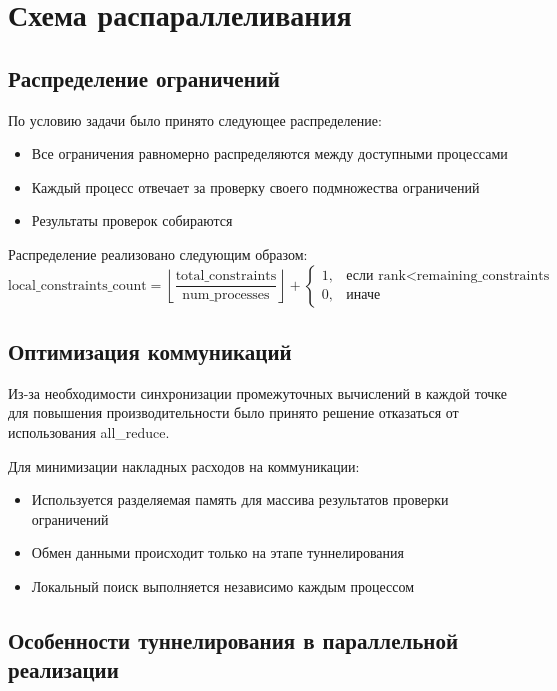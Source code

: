 \documentclass[12pt]{article}
\begin{document}
\section{Схема распараллеливания}
\subsection{Распределение ограничений}

По условию задачи было принято следующее распределение:
\begin{itemize}
    \item Все ограничения равномерно распределяются между доступными процессами
    \item Каждый процесс отвечает за проверку своего подмножества ограничений
    \item Результаты проверок собираются
\end{itemize}

Распределение реализовано следующим образом:
\begin{equation}
    \text{local\_constraints\_count} = \left\lfloor\frac{\text{total\_constraints}}{\text{num\_processes}}\right\rfloor + 
    \begin{cases}
        1, & \text{если } \text{rank} < \text{remaining\_constraints} \\
        0, & \text{иначе}
    \end{cases}
\end{equation}

\subsection{Оптимизация коммуникаций}
Из-за необходимости синхронизации промежуточных вычислений в каждой точке для повышения производительности было принято решение отказаться от использования all\_reduce.

Для минимизации накладных расходов на коммуникации:
\begin{itemize}
    \item Используется разделяемая память для массива результатов проверки ограничений
    \item Обмен данными происходит только на этапе туннелирования
    \item Локальный поиск выполняется независимо каждым процессом
\end{itemize}

\subsection{Особенности туннелирования в параллельной реализации}
\end{document}

